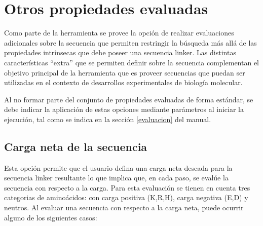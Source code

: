 \section{Otros propiedades evaluadas}

Como parte de la herramienta se provee la opción de realizar evaluaciones adicionales sobre la secuencia que permiten restringir la búsqueda más allá de las propiedades intrínsecas que debe poseer una secuencia linker.
Las distintas características ``extra'' que se permiten definir sobre la secuencia complementan el objetivo principal de la herramienta que es proveer secuencias que puedan ser utilizadas 
en el contexto de desarrollos experimentales de biología molecular.

Al no formar parte del conjunto de propiedades evaluadas de forma estándar, se debe indicar la aplicación de estas opciones mediante parámetros al iniciar la ejecución, tal como se indica en la sección \ref{evaluacion} del manual.

\subsection{Carga neta de la secuencia}

Esta opción permite que el usuario defina una carga neta deseada para la secuencia linker resultante lo que implica que, en cada paso, se evalúe la secuencia con respecto a la carga. 
Para esta evaluación se tienen en cuenta tres categorias de aminoácidos: con carga positiva (K,R,H), carga negativa (E,D) y neutros.
Al evaluar una secuencia con respecto a la carga neta, puede ocurrir alguno de los siguientes casos:

